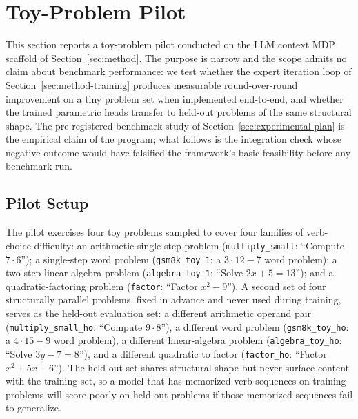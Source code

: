 \section{Toy-Problem Pilot}
\label{sec:pilot}


This section reports a toy-problem pilot conducted on the LLM context MDP
scaffold of Section~\ref{sec:method}. The purpose is narrow and the scope
admits no claim about benchmark performance: we test whether the expert
iteration loop of Section~\ref{sec:method-training} produces measurable
round-over-round improvement on a tiny problem set when implemented
end-to-end, and whether the trained parametric heads transfer to held-out
problems of the same structural shape. The pre-registered benchmark study
of Section~\ref{sec:experimental-plan} is the empirical claim of the
program; what follows is the integration check whose negative outcome
would have falsified the framework's basic feasibility before any
benchmark run.

\subsection{Pilot Setup}
\label{sec:pilot-setup}

The pilot exercises four toy problems sampled to cover four families of
verb-choice difficulty: an arithmetic single-step problem
(\texttt{multiply\_small}: ``Compute $7 \cdot 6$''); a single-step word
problem (\texttt{gsm8k\_toy\_1}: a $3 \cdot 12 - 7$ word problem); a
two-step linear-algebra problem (\texttt{algebra\_toy\_1}: ``Solve
$2x + 5 = 13$''); and a quadratic-factoring problem (\texttt{factor}:
``Factor $x^2 - 9$''). A second set of four structurally parallel
problems, fixed in advance and never used during training, serves as the
held-out evaluation set: a different arithmetic operand pair
(\texttt{multiply\_small\_ho}: ``Compute $9 \cdot 8$''), a different
word problem (\texttt{gsm8k\_toy\_ho}: a $4 \cdot 15 - 9$ word problem),
a different linear-algebra problem (\texttt{algebra\_toy\_ho}: ``Solve
$3y - 7 = 8$''), and a different quadratic to factor
(\texttt{factor\_ho}: ``Factor $x^2 + 5x + 6$''). The held-out set
shares structural shape but never surface content with the training set,
so a model that has memorized verb sequences on training problems will
score poorly on held-out problems if those memorized sequences fail to
generalize.

